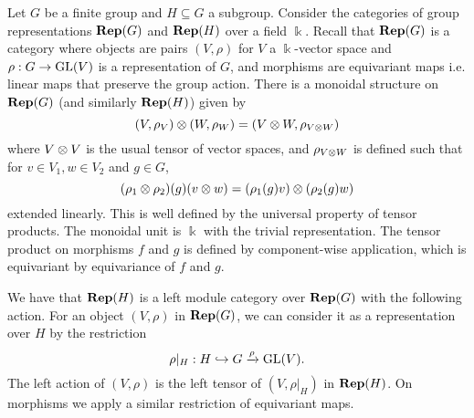 \begin{example}
    Let $G$ be a finite group and $H \subseteq G$ a subgroup. Consider the categories of group representations $\operatorname{\mathbf{Rep}}(G)$ and $\operatorname{\mathbf{Rep}}(H)$ over a field $\Bbbk$. Recall that $\operatorname{\mathbf{Rep}}(G)$ is a category where objects are pairs $(V, \rho)$ for $V$ a $\Bbbk$-vector space and $\rho: G \to \operatorname{GL}(V)$ is a representation of $G$, and morphisms are equivariant maps i.e. linear maps that preserve the group action. There is a monoidal structure on $\operatorname{\mathbf{Rep}}(G)$ (and similarly $\operatorname{\mathbf{Rep}}(H)$) given by
    \[
        (V, \rho_V) \otimes (W, \rho_W) = (V \otimes W, \rho_{V \otimes W})
    \]
    where $V \otimes V$ is the usual tensor of vector spaces, and $\rho_{V \otimes W}$ is defined such that for $v \in V_1, w \in V_2$ and $g \in G$,
    \[
        (\rho_1 \otimes \rho_2)(g)(v \otimes w) = (\rho_1(g) v) \otimes (\rho_2(g) w)
    \]
    extended linearly. This is well defined by the universal property of tensor products. The monoidal unit is $\Bbbk$ with the trivial representation. The tensor product on morphisms $f$ and $g$ is defined by component-wise application, which is equivariant by equivariance of $f$ and $g$.

    We have that $\operatorname{\mathbf{Rep}}(H)$ is a left module category over $\operatorname{\mathbf{Rep}}(G)$ with the following action. For an object $(V,\rho)$ in $\operatorname{\mathbf{Rep}}(G)$, we can consider it as a representation over $H$ by the restriction
    \[
        \rho|_H: H \hookrightarrow G \xrightarrow{\rho} \operatorname{GL}(V).
    \]
    The left action of $(V, \rho)$ is the left tensor of $(V,\rho|_H)$ in $\operatorname{\mathbf{Rep}}(H)$. On morphisms we apply a similar restriction of equivariant maps.
\end{example}
